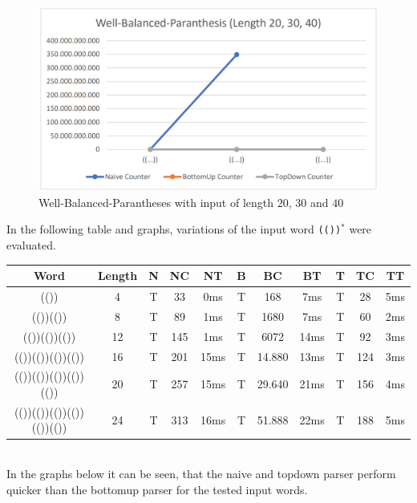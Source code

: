 \documentclass[a4paper, 11pt]{article}
\begin{document}
\begin{figure}[H]
\begin{center}
\includegraphics[scale=0.4]{diagrams/WBP_2.png}
\end{center}
\caption{Well-Balanced-Parantheses with input of length $20$, $30$ and $40$}
\end{figure}

In the following table and graphs, variations of the input word \texttt{(())$^*$} were evaluated.

\begin{small}
\begin{tabular}{|c|c||c|c|c||c|c|c||c|c|c|}
\hline
Word & Length & N & NC & NT & B & BC & BT & T & TC & TT \\
\hline
\hline
(()) & 4 & T & 33 & 0ms & T & 168 & 7ms & T & 28 & 5ms \\
\hline
(())(()) & 8 & T & 89 & 1ms & T & 1680 & 7ms & T & 60 & 2ms \\
\hline
(())(())(()) & 12 & T & 145 & 1ms & T & 6072 & 14ms & T & 92 & 3ms \\
\hline
(())(())(())(()) & 16 & T & 201 & 15ms & T & 14.880 & 13ms & T & 124 & 3ms \\
\hline
(())(())(())(())(()) & 20 & T & 257 & 15ms & T & 29.640 & 21ms & T & 156 & 4ms \\
\hline
(())(())(())(())(())(()) & 24 & T & 313 & 16ms & T & 51.888 & 22ms & T & 188 & 5ms \\
\hline

\end{tabular}
\end{small}
\ \\


In the graphs below it can be seen, that the naive and topdown parser perform quicker than the bottomup parser for the tested input words.
\end{document}
